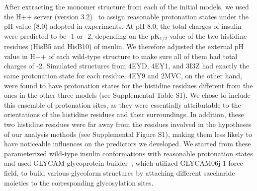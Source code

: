 \documentclass[9pt]{elife}
\begin{document}
After extracting the monomer structure from each of the initial models, we used the H++ server (version 3.2)~\cite{anandakrishnan2012h++, myers2006simple, gordon2005h++} to assign reasonable protonation states under the pH value (8.0) adopted in experiments. At pH 8.0, the total charges of insulin were predicted to be -1 or -2,  depending on the pK$_{1/2}$ value of the two histidine residues (HisB5 and HisB10) of insulin. We therefore adjusted the external pH value in H++ of each wild-type structure to make sure all of them had total charges of -2. Simulated structures from 4EYD, 4EY1, and 3I3Z had exactly the same protonation state for each residue. 4EY9 and 2MVC, on the other hand, were found to have protonation states for the histidine residues different from the ones in the other three models (see Supplemental Table S1).  We chose to include this ensemble of protonation sites, as they were essentially attributable to the orientations of the histidine residues and their surroundings. In addition, these two histidine residues were far away from the residues involved in the hypotheses of our analysis methods (see Supplemental Figure S1), making them less likely to have noticeable influences on the predictors we developed. We started from these parameterized wild-type insulin conformations with reasonable protonation states and used GLYCAM glycoprotein builder~\cite{kirschner2008glycam06}, which utilized GLYCAM06j-1 force field, to build various glycoform structures by attaching different saccharide moieties to the corresponding glycosylation sites. 
\end{document}
